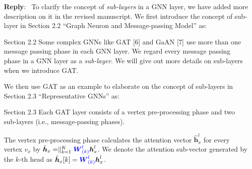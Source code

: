 \documentclass[12pt]{article}
\newcommand{\MyVec}[1]{\boldsymbol{#1}}
\newcommand{\MyMat}[1]{\boldsymbol{#1}}
\newcommand{\hvec}[1]{\hat{\boldsymbol{h}}_{#1}}
\newcommand{\Param}[1]{\textcolor{blue}{#1}}
\newenvironment{myquote}[1]%
{\vspace{0.5em}\begin{zitat}{#1}}
{\end{zitat}\vspace{0.5em}}
\newenvironment{reply}
   {\medskip \noindent \textbf{Reply}:\  }
   {\medskip}
\begin{document}
\begin{reply}
    To clarify the concept of \emph{sub-layers} in a GNN layer, we have added more description on it in the revised manuscript.
    We first introduce the concept of sub-layer in Section 2.2 ``Graph Neuron and Message-passing Model'' as:
    \begin{myquote}{Section 2.2}
        Some complex GNNs like GAT [6] and GaAN [7] use more than one message passing phase in each GNN layer.
        We regard every message passing phase in a GNN layer as a \emph{sub-layer}.
        We will give out more details on sub-layers when we introduce GAT.
    \end{myquote}
    We then use GAT as an example to elaborate on the concept of sub-layers in Section 2.3 ``Representative GNNs'' as:
    \begin{myquote}{Section 2.3}
        \newcommand{\GATCalcWeight}{\exp(LeakyReLU(\Param{\MyVec{a}}^T[\hvec{y}[k] \parallel \hvec{x}[k]]))}
        Each GAT layer consists of a vertex pre-processing phase and two sub-layers (i.e., message-passing phases).
        
        The vertex pre-processing phase calculates the attention vector $\hat{\boldsymbol{h}}^{l}_{x}$ for every vertex $v_x$ by $\hvec{x} = \parallel_{k=1}^K \Param{\MyMat{W}^l_{(k)}}\MyVec{h}^l_x$. We denote the attention sub-vector generated by the $k$-th head as $\hvec{x}[k]=\Param{\MyMat{W}^l_{(k)}}\MyVec{h}^l_x$.
        

\end{myquote}
\end{reply}
\end{document}

